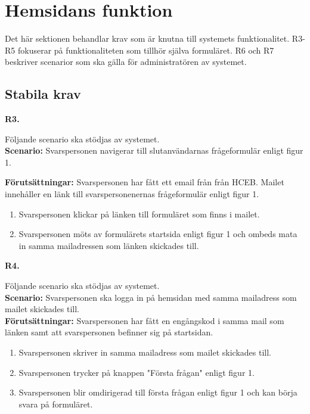 \documentclass{article}
\begin{document}
    \section{Hemsidans funktion}
\normalsize{Det här sektionen behandlar krav som är knutna till systemets funktionalitet. R3-R5 fokuserar på funktionaliteten som tillhör själva formuläret. R6 och R7 beskriver scenarior som ska gälla för administratören av systemet.
}
    \subsection{Stabila krav}
    
    \large{\textbf{R3.}}
    \normalsize{Följande scenario ska stödjas av systemet. \\
    \textbf{Scenario:} Svarspersonen navigerar till slutanvändarnas frågeformulär enligt figur 1.
        
    \noindent \textbf{Förutsättningar:} Svarspersonen har fått ett email från från HCEB. Mailet innehåller en länk till svarspersonenernas frågeformulär enligt figur 1.
        \begin{enumerate}
            \item Svarspersonen klickar på länken till formuläret som finns i mailet.
            \item Svarspersonen möts av formulärets startsida enligt figur 1 och ombeds mata in samma mailadressen som länken skickades till. 
        \end{enumerate}
}
\vspace{1em}

\noindent \large{\textbf{R4.}}
    \normalsize{Följande scenario ska stödjas av systemet. \\
    \textbf{Scenario:} Svarspersonen ska logga in på hemsidan med samma mailadress som mailet skickades till.
        \\
    \textbf{Förutsättningar:} Svarspersonen har fått en engångskod i samma mail som länken samt att svarspersonen befinner sig på startsidan.
        \begin{enumerate}
           \item Svarspersonen skriver in samma mailadress som mailet skickades till.
           \item Svarspersonen trycker på knappen "Första frågan" enligt figur 1.
           \item  Svarspersonen blir omdirigerad till första frågan enligt figur 1 och kan börja svara på formuläret.
        \end{enumerate}
   }
   
\end{document}
